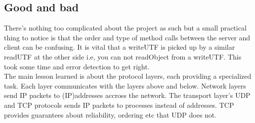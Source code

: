 \pagebreak
\subsection{Good and bad}
\label{tcp_conclusion}

There’s nothing too complicated about the project as such but a small practical thing to notice is that the order and type of method calls between the server and client can be confusing. It is vital that a writeUTF is picked up by a similar readUTF at the other side i.e, you can not readObject from a writeUTF. This took some time and error detection to get right.\\ 

The main lesson learned is about the protocol layers, each providing a specialized task. Each layer communicates with the layers above and below. 
Network layers send IP packets to (IP)addresses accross the network. The transport layer's UDP and TCP protocols sends IP packets to processes instead of addresses. TCP provides guarantees about reliability, ordering etc that UDP does not.


